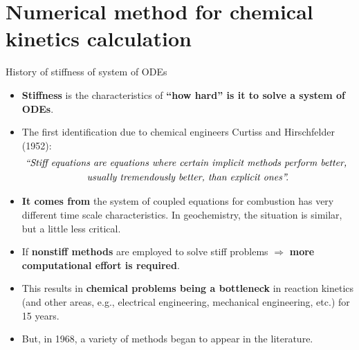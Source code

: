 \section{Numerical method for chemical kinetics calculation}
%
%
\begin{frame}{History of stiffness of system of ODEs}
	\begin{itemize}
		\item \alert{\bf Stiffness} is the characteristics of {\bf ``how hard'' is it to solve a system of ODEs}. 
		\pause
		\item The first identification due to chemical engineers 
		Curtiss and Hirschfelder (1952):\\[-20pt]
		\begin{multline*}
			\text{\emph{``Stiff equations are equations where certain implicit methods perform better, }} \\ 
			\text{\emph{usually tremendously better, than explicit ones''.}}
		\end{multline*}
		\vskip -10pt
		\pause
		\item \alert{\bf It comes from} the system of coupled equations for combustion has very different time scale characteristics. In geochemistry, the situation is similar, but a little less critical. 
	\pause
		\item If {\bf nonstiff methods} are employed to solve stiff problems $\Rightarrow$ {\bf more computational effort is required}.
		\pause
		\item This results in {\bf chemical problems being a bottleneck} in reaction kinetics (and other areas, e.g.,  electrical engineering, mechanical engineering, etc.) for 15 years.
		\pause
		\item But, in 1968, a variety of methods began to appear in the literature.
	\end{itemize}
\end{frame}
%
